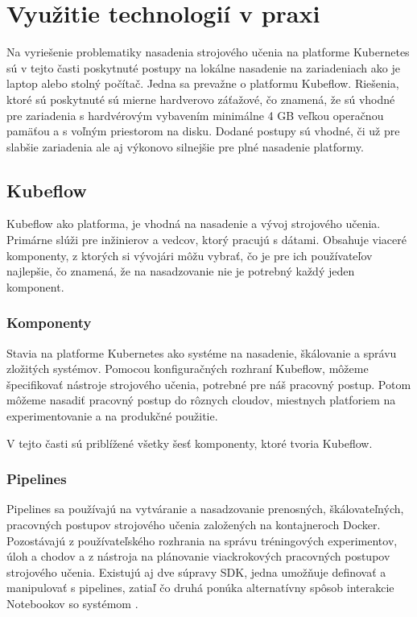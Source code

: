 
\chapter{Využitie technologií v praxi}
\label{methodology}

Na vyriešenie problematiky nasadenia strojového učenia na platforme Kubernetes sú v tejto časti poskytnuté postupy na lokálne nasadenie na zariadeniach ako je laptop alebo stolný počítač. Jedna sa prevažne o platformu Kubeflow. Riešenia, ktoré sú poskytnuté sú mierne hardverovo záťažové, čo znamená, že sú vhodné pre zariadenia s hardvérovým vybavením minimálne 4 GB veľkou operačnou pamäťou a s voľným priestorom na disku. Dodané postupy sú vhodné, či už pre slabšie zariadenia ale aj výkonovo silnejšie pre plné nasadenie platformy.

\section{Kubeflow}
Kubeflow ako platforma, je vhodná na nasadenie a vývoj strojového učenia. Primárne slúži pre inžinierov a vedcov, ktorý pracujú s dátami. Obsahuje viaceré komponenty, z ktorých si vývojári môžu vybrať, čo je pre ich používateľov najlepšie, čo znamená, že na nasadzovanie nie je potrebný každý jeden komponent.

\subsection{Komponenty}

Stavia na platforme Kubernetes ako systéme na nasadenie, škálovanie a správu zložitých systémov. Pomocou konfiguračných rozhraní Kubeflow, môžeme špecifikovať nástroje strojového učenia, potrebné pre náš pracovný postup. Potom môžeme nasadiť pracovný postup do rôznych cloudov, miestnych platforiem na experimentovanie a na produkčné použitie.

V tejto časti sú priblížené všetky šesť komponenty, ktoré tvoria Kubeflow.


\subsection*{Pipelines}

Pipelines sa používajú na vytváranie a nasadzovanie prenosných, škálovateľných, pracovných postupov strojového učenia založených na kontajneroch Docker. Pozostávajú z používateľského rozhrania na správu tréningových experimentov, úloh a chodov a z nástroja na plánovanie viackrokových pracovných postupov strojového učenia. Existujú aj dve súpravy SDK, jedna umožňuje definovať a manipulovať s pipelines, zatiaľ čo druhá ponúka alternatívny spôsob interakcie Notebookov so systémom \cite{pipe}.


